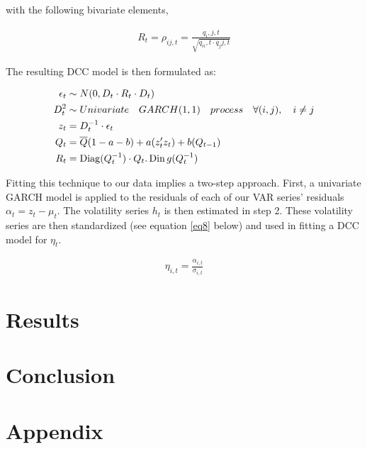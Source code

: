 \documentclass[11pt,preprint, authoryear]{elsarticle}
\numberwithin{equation}{section}
\numberwithin{figure}{section}
\numberwithin{table}{section}
\begin{document}
with the following bivariate elements,

\begin{align}
R _ { t } = \rho _ { i j ,t } = \frac { q _ { i } ,j ,t } { \sqrt { q _ { i i } ,t \cdot q _ { j } j ,t } } 
\end{align}

The resulting DCC model is then formulated as:

\begin{align}
\epsilon _ { t } &\sim N ( 0,D _ { t } \cdot R _ { t } \cdot D _ { t } ) \label{eq7}  \\ \notag
D^2_t &\sim Univariate\quad GARCH(1,1) \quad process \quad \forall (i,j),\quad i \ne j \\ \notag
z _ { t } &= D _ { t } ^ { - 1} \cdot \epsilon _ { t } \\ \notag
Q _ { t } &= \overline { Q } ( 1- a - b ) + a ( z _ { t } ^ { \prime } z _ { t } ) + b ( Q _ { t - 1} ) \\ \notag
R _ { t } &= \operatorname{Diag} ( Q _ { t } ^ { - 1} ) \cdot Q _ { t } .\operatorname{Din} g ( Q _ { t } ^ { - 1} )
\end{align}

Fitting this technique to our data implies a two-step approach. First, a
univariate GARCH model is applied to the residuals of each of our VAR
series' residuals \(\alpha_t = z_t - \mu_t\). The volatility series
\(h_t\) is then estimated in step 2. These volatility series are then
standardized (see equation \ref{eq8} below) and used in fitting a DCC
model for \(\eta _ { t }\).

\begin{align}
\eta _ { i ,t } = \frac { \alpha _ { i ,t } } { \sigma _ { i ,t } } \label{eq8}
\end{align}

\pagebreak

\section{Results}\label{results}

\section{Conclusion}\label{conclusion}

\section{\texorpdfstring{Appendix
\label{appendix}}{Appendix }}\label{appendix}
\end{document}
